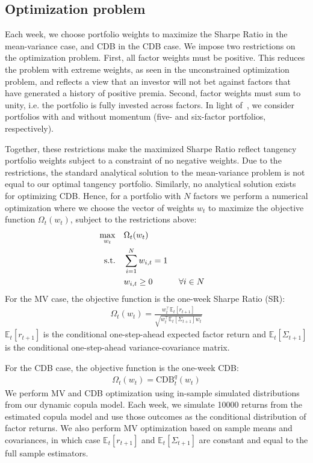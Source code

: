 
\subsection{Optimization problem} %
\label{sub:optimization_problem}

Each week, we choose portfolio weights to maximize the Sharpe Ratio in the mean-variance case, and CDB in the CDB case. We impose two restrictions on the optimization problem. First, all factor weights must be positive. This reduces the problem with extreme weights, as seen in the unconstrained optimization problem, and reflects a view that an investor will not bet against factors that have generated a history of positive premia. Second, factor weights must sum to unity, i.e. the portfolio is fully invested across factors. In light of~\textcite{Asness2015}, we consider portfolios with and without momentum (five- and six-factor portfolios, respectively).

Together, these restrictions make the maximized Sharpe Ratio reflect tangency portfolio weights subject to a constraint of no negative weights. Due to the restrictions, the standard analytical solution to the mean-variance problem is not equal to our optimal tangency portfolio. Similarly, no analytical solution exists for optimizing CDB. Hence, for a portfolio with $N$ factors we perform a numerical optimization where we choose the vector of weights $w_t$ to maximize the objective function $\Omega_t(w_t)$, subject to the restrictions above:
\begin{alignat}{2}
  \max_{w_t} \quad
    & \Omega_t(w_t)\  \\
  \text{s.t.\quad}
    & \sum_{i=1}^N w_{i,t} = 1 \notag \\
    & w_{i,t} \geq 0 &\ & \forall i \in N \notag
\end{alignat}
For the MV case, the objective function is the one-week Sharpe Ratio (SR):
\begin{align}
  \Omega_t(w_t) = \frac{w_t^\top \mathbb{E}_t[r_{t+1}]}{\sqrt{w_t^\top \mathbb{E}_t[\Sigma_{t+1}] w_t}}
\end{align}
$\mathbb{E}_t[r_{t+1}]$ is the conditional one-step-ahead expected factor return and $\mathbb{E}_t[\Sigma_{t+1}]$ is the conditional one-step-ahead variance-covariance matrix. 

For the CDB case, the objective function is the one-week CDB:
\begin{align}
  \Omega_t(w_t) = \text{CDB}_t^q(w_t)
\end{align}
We perform MV and CDB optimization using in-sample simulated distributions from our dynamic copula model. Each week, we simulate \num{10000} returns from the estimated copula model and use those outcomes as the conditional distribution of factor returns. We also perform MV optimization based on sample means and covariances, in which case $\mathbb{E}_t[r_{t+1}]$ and $\mathbb{E}_t[\Sigma_{t+1}]$ are constant and equal to the full sample estimators.


